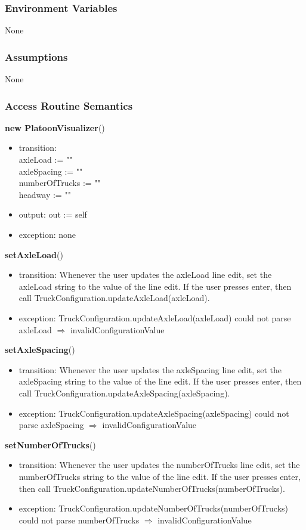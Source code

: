 \documentclass[12pt, titlepage]{article}
\begin{document}
\subsubsection{Environment Variables}
None
\subsubsection{Assumptions}
None
\subsubsection{Access Routine Semantics}

\noindent \textbf{new PlatoonVisualizer}()
\begin{itemize}
\item transition: \\
        axleLoad := ""\\
		axleSpacing := ""\\
		numberOfTrucks := ""\\
		headway := ""
\item output: out := self
\item exception: none
\end{itemize}

\noindent \textbf{setAxleLoad}()
\begin{itemize}
\item transition: Whenever the user updates the axleLoad line edit, set the axleLoad string to the value of the line edit. If the user presses enter, then call TruckConfiguration.updateAxleLoad(axleLoad).
\item exception: TruckConfiguration.updateAxleLoad(axleLoad) could not parse axleLoad $\Rightarrow$ invalidConfigurationValue
\end{itemize}

\noindent \textbf{setAxleSpacing}()
\begin{itemize}
\item transition: Whenever the user updates the axleSpacing line edit, set the axleSpacing string to the value of the line edit. If the user presses enter, then call TruckConfiguration.updateAxleSpacing(axleSpacing).
\item exception: TruckConfiguration.updateAxleSpacing(axleSpacing) could not parse axleSpacing $\Rightarrow$ invalidConfigurationValue
\end{itemize}

\noindent \textbf{setNumberOfTrucks}()
\begin{itemize}
\item transition: Whenever the user updates the numberOfTrucks line edit, set the numberOfTrucks string to the value of the line edit. If the user presses enter, then call TruckConfiguration.updateNumberOfTrucks(numberOfTrucks).
\item exception: TruckConfiguration.updateNumberOfTrucks(numberOfTrucks) could not parse numberOfTrucks $\Rightarrow$ invalidConfigurationValue
\end{itemize}
\end{document}
